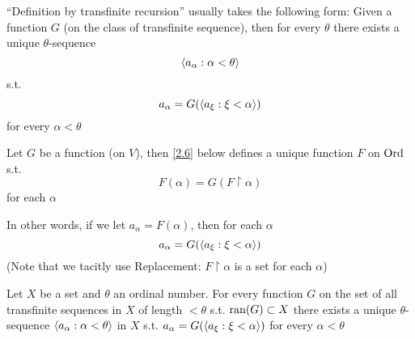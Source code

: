 \documentclass[11pt]{article}
\begin{document}
``Definition by transfinite recursion'' usually takes the following form: Given a function \(G\)
(on the class of transfinite sequence), then for every \(\theta\) there exists a unique \(\theta\)-sequence
\begin{equation*}
\langle a_\alpha:\alpha<\theta\rangle
\end{equation*}
s.t.
\begin{equation*}
a_\alpha=G(\langle a_\xi:\xi<\alpha\rangle)
\end{equation*}
for every \(\alpha<\theta\)

\begin{theorem}
Let \(G\) be a function (on \(V\)), then \eqref{2.6} below defines a unique function \(F\)
on \(\text{Ord}\) s.t.
\begin{equation*}
F(\alpha)=G(F\restriction\alpha)
\end{equation*}
for each \(\alpha\)
\end{theorem}

In other words, if we let \(a_\alpha=F(\alpha)\), then for each \(\alpha\)
\begin{equation*}
a_\alpha=G(\langle a_\xi:\xi<\alpha\rangle)
\end{equation*}
(Note that we tacitly use Replacement: \(F\restriction\alpha\) is a set for each \(\alpha\))

\begin{corollary}[]
Let \(X\) be a set and \(\theta\) an ordinal number. For every function \(G\) on the set of all
transfinite sequences in \(X\) of length \(<\theta\) s.t. \(\operatorname{ran}(G)\subset X\) there exists a unique
\(\theta\)-sequence \(\langle a_\alpha:\alpha<\theta\rangle\) in \(X\) s.t. \(a_\alpha=G(\langle a_\xi:\xi<\alpha\rangle)\) for every \(\alpha<\theta\)
\end{corollary}
\end{document}
